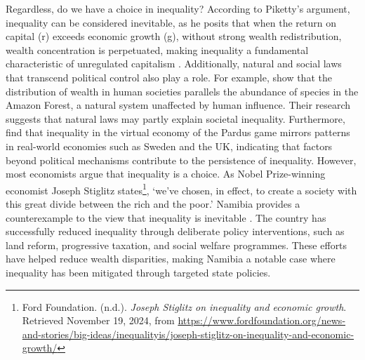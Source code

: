 \documentclass[12pt]{article}
\begin{document}
Regardless, do we have a choice in inequality? According to Piketty’s argument, inequality can be considered inevitable, as he posits that when the return on capital (r) exceeds economic growth (g), without strong wealth redistribution, wealth concentration is perpetuated, making inequality a fundamental characteristic of unregulated capitalism \parencite{piketty2014capital}. Additionally, natural and social laws that transcend political control also play a role. For example, \textcite{scheffer2017inequality} show that the distribution of wealth in human societies parallels the abundance of species in the Amazon Forest, a natural system unaffected by human influence. Their research suggests that natural laws may partly explain societal inequality. Furthermore, \textcite{fuchs2014behavioral} find that inequality in the virtual economy of the Pardus game mirrors patterns in real-world economies such as Sweden and the UK, indicating that factors beyond political mechanisms contribute to the persistence of inequality. However, most economists argue that inequality is a choice. As Nobel Prize-winning economist Joseph Stiglitz states\footnote{Ford Foundation. (n.d.). \textit{Joseph Stiglitz on inequality and economic growth}. Retrieved November 19, 2024, from \href{https://www.fordfoundation.org/news-and-stories/big-ideas/inequalityis/joseph-stiglitz-on-inequality-and-economic-growth/}{https://www.fordfoundation.org/news-and-stories/big-ideas/inequalityis/joseph-stiglitz-on-inequality-and-economic-growth/} }, `we’ve chosen, in effect, to create a society with this great divide between the rich and the poor.' Namibia provides a counterexample to the view that inequality is inevitable \parencite{lawson2017inequality}. The country has successfully reduced inequality through deliberate policy interventions, such as land reform, progressive taxation, and social welfare programmes. These efforts have helped reduce wealth disparities, making Namibia a notable case where inequality has been mitigated through targeted state policies.
\end{document}
